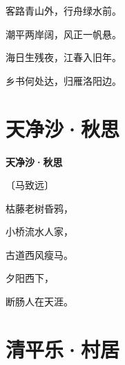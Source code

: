 \documentclass[12pt,UTF-8,openany,fontset=none]{ctexbook}
\begin{document}
    \vspace{18pt}  %

\begin{center}
    \begin{Large}

        客路青山外，行舟绿水前。

        潮平两岸阔，风正一帆悬。

        海日生残夜，江春入旧年。

        乡书何处达，归雁洛阳边。

    \end{Large}

\end{center}

\vspace{8pt}
\clearpage

\section{天净沙·秋思}


\begin{center}
    {\bfseries 天净沙·秋思}

    \vspace{18pt}

    \begin{large}\xuwen
        〔马致远〕
    \end{large}

\end{center}

    \vspace{18pt}  %

\begin{center}
    \begin{Large}

        枯藤老树昏鸦，

        小桥流水人家，

        古道西风瘦马。

        夕阳西下，\hspace{25pt}

        断肠人在天涯。

    \end{Large}

\end{center}

\vspace{8pt}
\clearpage

\section{清平乐·村居}
\end{document}
